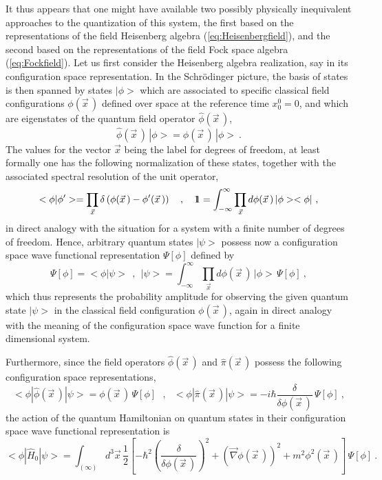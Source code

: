 \documentclass[a4paper,11pt]{article}
\def\one{1\hskip -.37em 1}
\begin{document}
It thus appears that one might have available two possibly physically 
inequivalent approaches to the quantization of this system, the first based 
on the representations of the field Heisenberg algebra 
(\ref{eq:Heisenbergfield}), and the second based on the representations of 
the field Fock space algebra (\ref{eq:Fockfield}). Let us first consider 
the Heisenberg algebra realization, say in its configuration space 
representation. In the Schr\"odinger picture, the basis of states is then 
spanned by states $|\phi>$ which are associated to specific classical field 
configurations $\phi(\vec{x}\,)$ defined over space at the reference time 
$x^0_0=0$, and which are eigenstates of the quantum field operator 
$\hat{\phi}(\vec{x}\,)$,
\begin{equation}
\hat{\phi}(\vec{x}\,)\,|\phi>=\phi(\vec{x}\,)\,|\phi>\ .
\end{equation}
The values for the vector $\vec{x}$ being the label for degrees of freedom,
at least formally one has the following normalization of these states,
together with the associated spectral resolution of the unit operator,
\begin{equation}
<\phi|\phi'>=\prod_{\vec{x}}\delta\left(\phi(\vec{x}\,)-\phi'(\vec{x}\,)\right)
\ \ \ ,\ \ \ 
\one=\int_{-\infty}^\infty\prod_{\vec{x}}d\phi(\vec{x}\,)\,|\phi><\phi|\ ,
\end{equation}
in direct analogy with the situation for a system with a finite number
of degrees of freedom. Hence, arbitrary quantum states $|\psi>$ possess now 
a configuration space wave functional representation $\Psi[\phi]$ defined by
\begin{equation}
\Psi[\phi]=<\phi|\psi>\ \ ,\ \ 
|\psi>=\int_{-\infty}^\infty\prod_{\vec{x}}d\phi(\vec{x}\,)\,|\phi>\,\Psi[\phi]
\ ,
\end{equation}
which thus represents the probability amplitude for observing the given
quantum state $|\psi>$ in the classical field configuration $\phi(\vec{x}\,)$,
again in direct analogy with the meaning of the configuration space
wave function for a finite dimensional system.

Furthermore, since the field operators $\hat{\phi}(\vec{x}\,)$ and
$\hat{\pi}(\vec{x}\,)$ possess the following configuration space
representations,
\begin{equation}
<\phi|\hat{\phi}(\vec{x}\,)|\psi>=\phi(\vec{x}\,)\,\Psi[\phi]\ \ \ ,\ \ \ 
<\phi|\hat{\pi}(\vec{x}\,)|\psi>=-i\hbar\frac{\delta}{\delta\phi(\vec{x}\,)}\,
\Psi[\phi]\ ,
\end{equation}
the action of the quantum Hamiltonian on quantum states in their configuration
space wave functional representation is
\begin{equation}
<\phi|\hat{H}_0|\psi>=\int_{(\infty)}d^3\vec{x}\,
\frac{1}{2}\left[-\hbar^2\left(\frac{\delta}{\delta\phi(\vec{x}\,)}\right)^2+
\left(\vec{\nabla}\phi(\vec{x}\,)\right)^2+m^2\phi^2(\vec{x}\,)\right]\,
\Psi[\phi]\ .
\end{equation}
\end{document}
